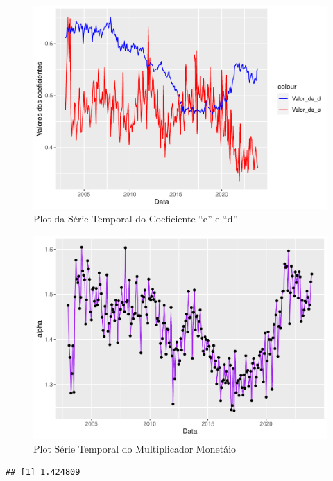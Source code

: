 \documentclass[12pt]{article}
\begin{document}
\begin{figure}
\centering
\includegraphics{multiplicador_files/figure-latex/unnamed-chunk-8-1.pdf}
\caption{Plot da Série Temporal do Coeficiente ``e'' e ``d''}
\end{figure}

\begin{figure}
\centering
\includegraphics{multiplicador_files/figure-latex/unnamed-chunk-9-1.pdf}
\caption{Plot Série Temporal do Multiplicador Monetáio}
\end{figure}

\begin{verbatim}
## [1] 1.424809
\end{verbatim}	

	
\end{document}
